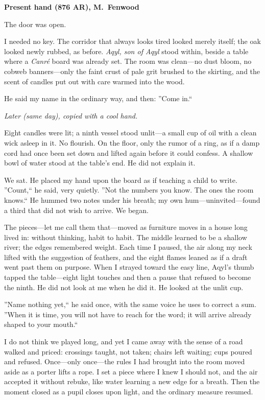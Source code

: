 \documentclass[11pt]{article}
\numberwithin{equation}{section} %
\theoremstyle{plain} %
\theoremstyle{definition} %
\theoremstyle{remark} %
\begin{document}
\noindent\textbf{Present hand (876 AR), M.\ Fenwood}

The door was open.

I needed no key. The corridor that always looks tired looked merely itself; the oak looked newly rubbed, as before. \textit{Aqyl, son of Aqyl} stood within, beside a table where a \emph{Canr\'e} board was already set. The room was clean---no dust bloom, no cobweb banners---only the faint crust of pale grit brushed to the skirting, and the scent of candles put out with care warmed into the wood.

He said my name in the ordinary way, and then: ''Come in.``

\medskip
\noindent\textit{Later (same day), copied with a cool hand.}

Eight candles were lit; a ninth vessel stood unlit---a small cup of oil with a clean wick asleep in it. No flourish. On the floor, only the rumor of a ring, as if a damp cord had once been set down and lifted again before it could confess. A shallow bowl of water stood at the table's end. He did not explain it.

We sat. He placed my hand upon the board as if teaching a child to write. ''Count,`` he said, very quietly. ''Not the numbers you know. The ones the room knows.`` He hummed two notes under his breath; my own hum---uninvited---found a third that did not wish to arrive. We began.

The pieces---let me call them that---moved as furniture moves in a house long lived in: without thinking, habit to habit. The middle learned to be a shallow river; the edges remembered weight. Each time I paused, the air along my neck lifted with the suggestion of feathers, and the eight flames leaned as if a draft went past them on purpose. When I strayed toward the easy line, Aqyl's thumb tapped the table---eight light touches and then a pause that refused to become the ninth. He did not look at me when he did it. He looked at the unlit cup.

''Name nothing yet,`` he said once, with the same voice he uses to correct a sum. ''When it is time, you will not have to reach for the word; it will arrive already shaped to your mouth.``

I do not think we played long, and yet I came away with the sense of a road walked and priced: crossings taught, not taken; chairs left waiting; cups poured and refused. Once---only once---the rules I had brought into the room moved aside as a porter lifts a rope. I set a piece where I knew I should not, and the air accepted it without rebuke, like water learning a new edge for a breath. Then the moment closed as a pupil closes upon light, and the ordinary measure resumed.
\end{document}
